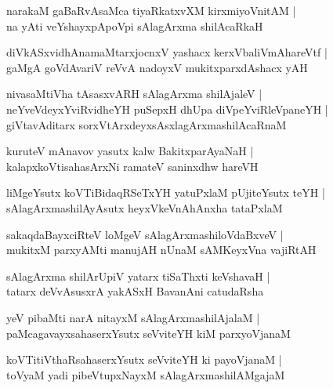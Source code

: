 \documentclass[twoside,12pt,openright]{book}
\newcounter{shloka}[chapter]
\begin{document}
\begin{shloka}
narakaM gaBaRvAsaMca tiyaRkatxvXM kirxmiyoVnitAM |\\
na yAti veYshayxpApoVpi sAlagArxma shilAcaRkaH 
\end{shloka}

\begin{shloka}
diVkASxvidhAnamaMtarxjocnxV yashacx kerxVbaliVmAhareVtf |\\
gaMgA goVdAvariV reVvA nadoyxV mukitxparxdAshacx yAH  
\end{shloka}

\begin{shloka}
nivasaMtiVha tAsasxvARH sAlagArxma shilAjaleV |\\
neYveVdeyxYviRvidheYH puSepxH dhUpa diVpeYviRleVpaneYH |\\
giVtavAditarx sorxVtArxdeyxsAsxlagArxmashilAcaRnaM 
\end{shloka}

\begin{shloka}
kuruteV mAnavov yasutx kalw BakitxparAyaNaH |\\
kalapxkoVtisahasArxNi ramateV saninxdhw hareVH 
\end{shloka}

\begin{shloka}
liMgeYsutx koVTiBidaqRSeTxYH yatuPxlaM pUjiteYsutx teYH |\\
sAlagArxmashilAyAsutx heyxVkeVnAhAnxha tataPxlaM 
\end{shloka}

\begin{shloka}
sakaqdaBayxciRteV loMgeV sAlagArxmashiloVdaBxveV |\\
mukitxM parxyAMti manujAH nUnaM sAMKeyxVna vajiRtAH 
\end{shloka}

\begin{shloka}
sAlagArxma shilArUpiV yatarx tiSaThxti keVshavaH |\\
tatarx deVvAsusxrA yakASxH BavanAni catudaRsha
\end{shloka}

\begin{shloka}
yeV pibaMti narA nitayxM sAlagArxmashilAjalaM |\\
paMcagavayxsahaserxYsutx seVviteYH kiM parxyoVjanaM
\end{shloka}

\begin{shloka}
koVTitiVthaRsahaserxYsutx seVviteYH ki  payoVjanaM |\\
toVyaM yadi pibeVtupxNayxM sAlagArxmashilAMgajaM 
\end{shloka}
\end{document}
